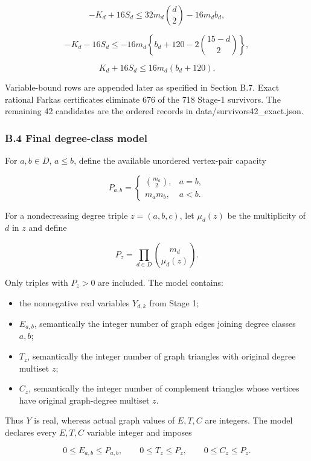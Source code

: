 \documentclass[
  english,
  11pt,
  a4paper,
]{article}
\providecommand{\tightlist}{%
  \setlength{\itemsep}{0pt}\setlength{\parskip}{0pt}}
\begin{document}
\[
-K_d+16S_d\le32m_d\binom d2-16m_db_d,
\tag{B.21}
\]

\[
-K_d-16S_d
\le-16m_d\left\{b_d+120-2\binom{15-d}{2}\right\},
\tag{B.22}
\]

\[
K_d+16S_d\le16m_d(b_d+120).
\tag{B.23}
\]

Variable-bound rows are appended later as specified in Section B.7.
Exact rational Farkas certificates eliminate 676 of the 718 Stage-1
survivors. The remaining 42 candidates are the ordered records in
data/survivors42\_exact.json.

\subsubsection{B.4 Final degree-class
model}\label{b.4-final-degree-class-model}

For \(a,b\in D\), \(a\le b\), define the available unordered vertex-pair
capacity

\[
P_{a,b}=
\begin{cases}
\binom{m_a}{2},&a=b,\\
m_am_b,&a<b.
\end{cases}
\tag{B.24}
\]

For a nondecreasing degree triple \(z=(a,b,c)\), let \(\mu_d(z)\) be the
multiplicity of \(d\) in \(z\) and define

\[
P_z=\prod_{d\in D}\binom{m_d}{\mu_d(z)}.
\tag{B.25}
\]

Only triples with \(P_z>0\) are included. The model contains:

\begin{itemize}
\tightlist
\item
  the nonnegative real variables \(Y_{d,k}\) from Stage 1;
\item
  \(E_{a,b}\), semantically the integer number of graph edges joining
  degree classes \(a,b\);
\item
  \(T_z\), semantically the integer number of graph triangles with
  original degree multiset \(z\);
\item
  \(C_z\), semantically the integer number of complement triangles whose
  vertices have original graph-degree multiset \(z\).
\end{itemize}

Thus \(Y\) is real, whereas actual graph values of \(E,T,C\) are
integers. The model declares every \(E,T,C\) variable integer and
imposes

\[
0\le E_{a,b}\le P_{a,b},\qquad
0\le T_z\le P_z,\qquad
0\le C_z\le P_z.
\tag{B.26}
\]
\end{document}
